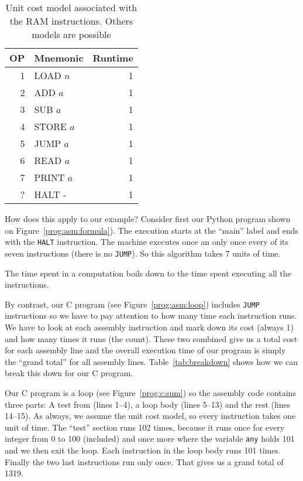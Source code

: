 \documentclass{aldast}
\begin{document}
\begin{table}[htbp]
  \begin{center}
    \begin{tabular}{r>{\ttfamily}lr}
      \toprule
      OP & Mnemonic & Runtime \\
      \midrule
      1  & LOAD $n$   & 1           \\
      2  & ADD $a$    & 1           \\
      3  & SUB $a$    & 1           \\
      4  & STORE $a$  & 1           \\
      5  & JUMP $a$   & 1           \\
      6  & READ $a$   & 1           \\
      7  & PRINT $a$  & 1           \\
      ?  & HALT -     & 1           \\
      \bottomrule
    \end{tabular}
  \end{center}
  \caption{Unit cost model associated with the RAM instructions. Others models are possible}
  \label{tab:costs}
\end{table}

How does this apply to our example? Consider first our Python program
shown on Figure~\ref{prog:asm:formula}). The execution starts at the
``main'' label and ends with the \texttt{HALT} instruction. The
machine executes once an only once every of its seven instructions
(there is no \texttt{JUMP}). So this algorithm takes 7 units of time.

\begin{takeaway}
  The time spent in a computation boils down to the time spent
  executing all the instructions.
\end{takeaway}

By contrast, our C program (see Figure~\ref{prog:asm:loop}) includes
\texttt{JUMP} instructions so we have to pay attention to how many
time each instruction runs. We have to look at each assembly
instruction and mark down its cost (always 1) and how many times it
runs (the count). These two combined give us a total cost for each
assembly line and the overall execution time of our program is simply
the ``grand total'' for all assembly lines. Table~\ref{tab:breakdown}
shows how we can break this down for our C program.

Our C program is a loop (see Figure~\ref{prog:c:sum}) so the assembly
code contains three parts: A test from (lines 1--4), a loop body
(lines 5--13) and the rest (lines 14--15). As always, we assume the
unit cost model, so every instruction takes one unit of time. The
``test'' section runs 102 times, because it runs once for every
integer from 0 to 100 (included) and once more where the variable
\texttt{any} holds 101 and we then exit the loop. Each instruction in the
loop body runs 101 times. Finally the two last instructions run only
once. That gives us a grand total of 1319.
\end{document}
